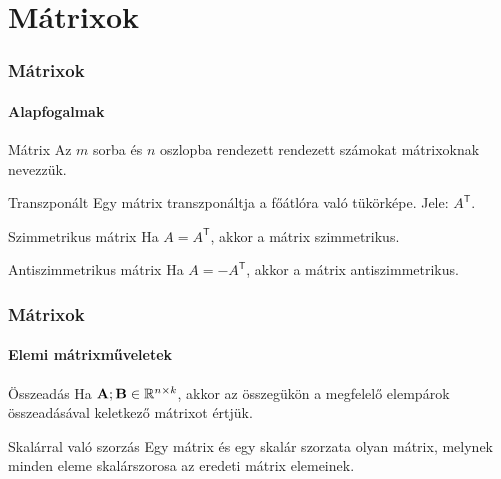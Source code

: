 \section{Mátrixok}
\begin{frame}
  \frametitle{Mátrixok}
  \framesubtitle{Alapfogalmak}

  \vfill

  \begin{block}{Mátrix}
    Az $m$ sorba és $n$ oszlopba rendezett rendezett számokat mátrixoknak
    nevezzük.
  \end{block}

  \vfill

  \begin{block}{Transzponált}
    Egy mátrix transzponáltja a főátlóra való tükörképe. Jele: $A^\mathsf T$.
  \end{block}

  \vfill

  \begin{block}{Szimmetrikus mátrix}
    Ha $A = A^\mathsf T$, akkor a mátrix szimmetrikus.
  \end{block}

  \vfill

  \begin{block}{Antiszimmetrikus mátrix}
    Ha $A = -A^\mathsf T$, akkor a mátrix antiszimmetrikus.
  \end{block}

  \vfill
\end{frame}

\begin{frame}
  \frametitle{Mátrixok}
  \framesubtitle{Elemi mátrixműveletek}

  \vfill

  \begin{block}{Összeadás}
    Ha $\mathbf{A}; \mathbf{B} \in \mathbb R^{n \times k}$, akkor az összegükön a
    megfelelő elempárok összeadásával keletkező mátrixot értjük.
  \end{block}

  \vfill

  \begin{block}{Skalárral való szorzás}
    Egy mátrix és egy skalár szorzata olyan mátrix, melynek minden eleme
    skalárszorosa az eredeti mátrix elemeinek.
  \end{block}

  \vfill
\end{frame}

